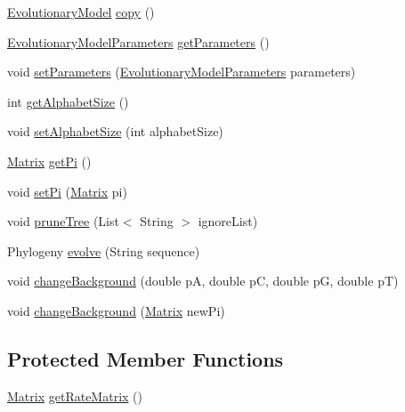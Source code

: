 \begin{DoxyCompactItemize}
\item 
\hyperlink{classbroad_1_1core_1_1siphy_1_1_evolutionary_model}{Evolutionary\+Model} \hyperlink{classbroad_1_1core_1_1siphy_1_1_evolutionary_model_aa418445762f1cbcb395dac8c0effbad6}{copy} ()
\item 
\hyperlink{classbroad_1_1core_1_1siphy_1_1_evolutionary_model_parameters}{Evolutionary\+Model\+Parameters} \hyperlink{classbroad_1_1core_1_1siphy_1_1_evolutionary_model_a362676dce20e057dfa97bb7e60ea0886}{get\+Parameters} ()
\item 
void \hyperlink{classbroad_1_1core_1_1siphy_1_1_evolutionary_model_aa3bcbca13ff568ed8fc90182c1a71a2e}{set\+Parameters} (\hyperlink{classbroad_1_1core_1_1siphy_1_1_evolutionary_model_parameters}{Evolutionary\+Model\+Parameters} parameters)
\item 
int \hyperlink{classbroad_1_1core_1_1siphy_1_1_evolutionary_model_a8a5a312efd9ed9fa6d0b10ad27521f1f}{get\+Alphabet\+Size} ()
\item 
void \hyperlink{classbroad_1_1core_1_1siphy_1_1_evolutionary_model_ac8fd7b6ca53f99772a505a5d62d77a10}{set\+Alphabet\+Size} (int alphabet\+Size)
\item 
\hyperlink{class_jama_1_1_matrix}{Matrix} \hyperlink{classbroad_1_1core_1_1siphy_1_1_evolutionary_model_a535a4ad36f0c8da1dd617be5cfed66a1}{get\+Pi} ()
\item 
void \hyperlink{classbroad_1_1core_1_1siphy_1_1_evolutionary_model_a161641aefb263800c873b447e4d87d3a}{set\+Pi} (\hyperlink{class_jama_1_1_matrix}{Matrix} pi)
\item 
void \hyperlink{classbroad_1_1core_1_1siphy_1_1_evolutionary_model_a5488d60cecd030a6b155963c06cf8c5c}{prune\+Tree} (List$<$ String $>$ ignore\+List)
\item 
Phylogeny \hyperlink{classbroad_1_1core_1_1siphy_1_1_evolutionary_model_a1a52ec3724e75cd7ae1df2d0971d5bc1}{evolve} (String sequence)
\item 
void \hyperlink{classbroad_1_1core_1_1siphy_1_1_evolutionary_model_ae948a8e429c783cd525b495186edfa16}{change\+Background} (double p\+A, double p\+C, double p\+G, double p\+T)
\item 
void \hyperlink{classbroad_1_1core_1_1siphy_1_1_evolutionary_model_ac437b29e748a9874861b28b951ba691e}{change\+Background} (\hyperlink{class_jama_1_1_matrix}{Matrix} new\+Pi)
\end{DoxyCompactItemize}
\subsection*{Protected Member Functions}
\begin{DoxyCompactItemize}
\item 
\hyperlink{class_jama_1_1_matrix}{Matrix} \hyperlink{classbroad_1_1core_1_1siphy_1_1_evolutionary_model_a876a93aa4071613481f8e4366e66169d}{get\+Rate\+Matrix} ()
\end{DoxyCompactItemize}


